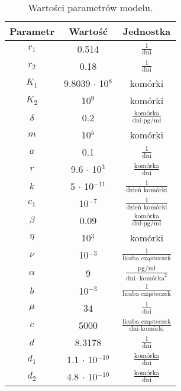 \documentclass[a4paper,12pt,twoside,polish]{book}
\theoremstyle{definition}
\theoremstyle{plain}
\theoremstyle{definition}
\begin{document}
\begin{table}[!ht]
\centering
\begin{tabular}{|c|c|c|}

\hline
   Parametr & Wartość & Jednostka \\
   \hline \hline
   $r_{1}$ & 0.514 & $\frac{1}{\text{dni}}$ \\
   \hline
   $r_{2}$ & 0.18 & $\frac{1}{\text{dni}}$ \\
   \hline
   $K_{1}$ & 9.8039 $\cdot$ 10$^{8}$ & komórki \\
   \hline
   $K_{2}$ & 10$^{9}$ & komórki \\
   \hline
   $\delta$ & 0.2 & $\frac{\text{komórka}}{\text{dni} \cdot \text{pg/ml}}$\\
   \hline
   $m$ & 10$^{5}$ & komórki \\
   \hline
   $a$ & 0.1 & $\frac{1}{\text{dni}}$\\
   \hline
   $r$ & 9.6 $\cdot$ 10$^{3}$ & $\frac{\text{komórka}}{\text{dni}}$\\
   \hline
   $k$ & 5 $\cdot$ 10$^{-11}$ & $\frac{1}{\text{dzień komórki}}$\\
   \hline
   $c_{1}$ & 10$^{-7}$ & $\frac{1}{\text{dzień komórki}}$\\
   \hline
   $\beta$ & 0.09 & $\frac{\text{komórka}}{\text{dni} \cdot \text{pg/ml}}$\\
   \hline
   $\eta$ & 10$^{3}$ & komórki\\
   \hline
   $\nu$ & 10$^{-3}$ & $\frac{1}{\text{liczba cząsteczek}}$\\
   \hline
   $\alpha$ & 9 & $\frac{\text{pg/ml}}{\text{dni} \cdot \text{komórka}^{2}}$\\
   \hline
   $b$ & 10$^{-3}$ & $\frac{1}{\text{liczba cząsteczek}}$\\
   \hline
   $\mu$ & 34 & $\frac{1}{\text{dni}}$\\
   \hline
   $c$ & 5000 & $\frac{\text{liczba cząsteczek}}{\text{dni} \cdot \text{komórki}}$\\
   \hline
   $d$ & 8.3178 & $\frac{1}{\text{dni}}$\\
   \hline
   $d_{1}$ & 1.1 $\cdot$ 10$^{-10}$ & $\frac{\text{komórka}}{\text{dni}}$\\
   \hline
   $d_{2}$ & 4.8 $\cdot$ 10$^{-10}$ & $\frac{\text{komórka}}{\text{dni}}$\\
   \hline
\end{tabular}
\caption{ Wartości parametrów modelu.}
\label{tabela_2}
\end{table}
\end{document}
